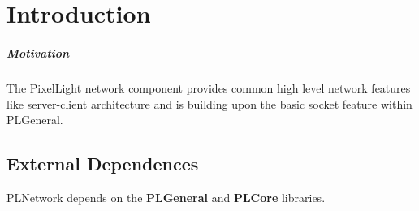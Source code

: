 \chapter{Introduction}


\paragraph{Motivation}
The PixelLight network component provides common high level network features like server-client architecture and is building upon the basic socket feature within PLGeneral.




\section{External Dependences}
PLNetwork depends on the \textbf{PLGeneral} and \textbf{PLCore} libraries.
